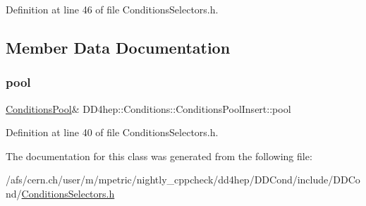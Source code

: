 Definition at line 46 of file Conditions\+Selectors.\+h.



\subsection{Member Data Documentation}
\hypertarget{class_d_d4hep_1_1_conditions_1_1_conditions_pool_insert_a3b76b291e4a502751367ea7bd0b357b6}{}\label{class_d_d4hep_1_1_conditions_1_1_conditions_pool_insert_a3b76b291e4a502751367ea7bd0b357b6} 
\subsubsection{\texorpdfstring{pool}{pool}}
{\footnotesize\ttfamily \hyperlink{class_d_d4hep_1_1_conditions_1_1_conditions_pool}{Conditions\+Pool}\& D\+D4hep\+::\+Conditions\+::\+Conditions\+Pool\+Insert\+::pool\hspace{0.3cm}{\ttfamily [private]}}



Definition at line 40 of file Conditions\+Selectors.\+h.



The documentation for this class was generated from the following file\+:\begin{DoxyCompactItemize}
\item 
/afs/cern.\+ch/user/m/mpetric/nightly\+\_\+cppcheck/dd4hep/\+D\+D\+Cond/include/\+D\+D\+Cond/\hyperlink{_conditions_selectors_8h}{Conditions\+Selectors.\+h}\end{DoxyCompactItemize}
